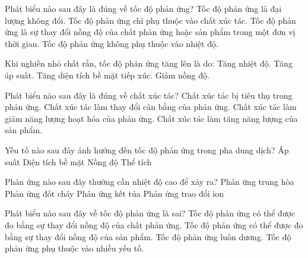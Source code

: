 \documentclass[Main.tex]{subfiles}
\begin{document}
\begin{ex}
	Phát biểu nào sau đây là đúng về tốc độ phản ứng?
	\choice
	{Tốc độ phản ứng là đại lượng không đổi.}
	{Tốc độ phản ứng chỉ phụ thuộc vào chất xúc tác.}
	{\True Tốc độ phản ứng là sự thay đổi nồng độ của chất phản ứng hoặc sản phẩm trong một đơn vị thời gian.}
	{Tốc độ phản ứng không phụ thuộc vào nhiệt độ.}
\end{ex}

\begin{ex}
	Khi nghiền nhỏ chất rắn, tốc độ phản ứng tăng lên là do:
	\choice
	{Tăng nhiệt độ.}
	{Tăng áp suất.}
	{\True Tăng diện tích bề mặt tiếp xúc.}
	{Giảm nồng độ.}
\end{ex}

\begin{ex}
	Phát biểu nào sau đây là đúng về chất xúc tác?
	\choice
	{Chất xúc tác bị tiêu thụ trong phản ứng.}
	{Chất xúc tác làm thay đổi cân bằng của phản ứng.}
	{\True Chất xúc tác làm giảm năng lượng hoạt hóa của phản ứng.}
	{Chất xúc tác làm tăng năng lượng của sản phẩm.}
\end{ex}

\begin{ex}
	Yếu tố nào sau đây ảnh hưởng đến tốc độ phản ứng trong pha dung dịch?
	\choice
	{Áp suất}
	{Diện tích bề mặt}
	{\True Nồng độ}
	{Thể tích}
\end{ex}

\begin{ex}
	Phản ứng nào sau đây thường cần nhiệt độ cao để xảy ra?
	\choice
	{Phản ứng trung hòa}
	{\True Phản ứng đốt cháy}
	{Phản ứng kết tủa}
	{Phản ứng trao đổi ion}
\end{ex}

\begin{ex}
	Phát biểu nào sau đây về tốc độ phản ứng là sai?
	\choice
	{Tốc độ phản ứng có thể được đo bằng sự thay đổi nồng độ của chất phản ứng.}
	{Tốc độ phản ứng có thể được đo bằng sự thay đổi nồng độ của sản phẩm.}
	{\True Tốc độ phản ứng luôn dương.}
	{Tốc độ phản ứng phụ thuộc vào nhiều yếu tố.}
\end{ex}
\end{document}

